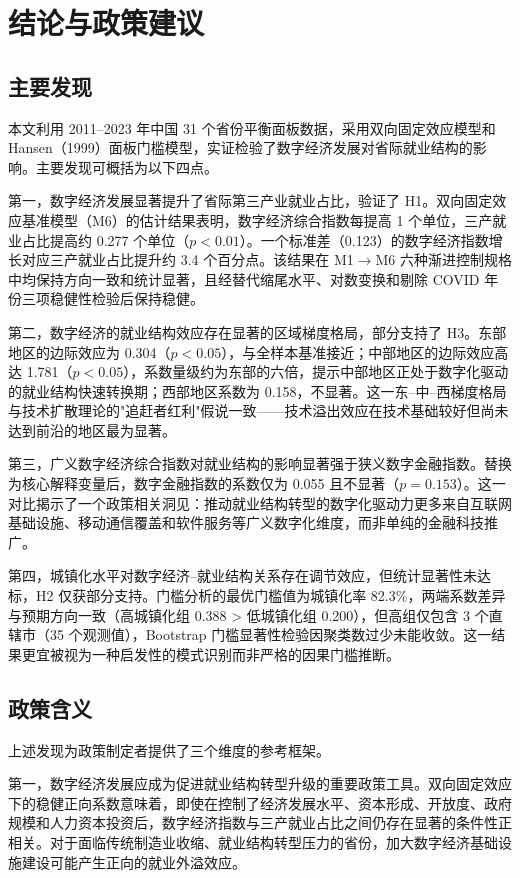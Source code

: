 \section{结论与政策建议}

\subsection{主要发现}

本文利用 2011--2023 年中国 31 个省份平衡面板数据，采用双向固定效应模型和 Hansen（1999）面板门槛模型，实证检验了数字经济发展对省际就业结构的影响。主要发现可概括为以下四点。

第一，数字经济发展显著提升了省际第三产业就业占比，验证了 H1。双向固定效应基准模型（M6）的估计结果表明，数字经济综合指数每提高 1 个单位，三产就业占比提高约 0.277 个单位（$p<0.01$）。一个标准差（0.123）的数字经济指数增长对应三产就业占比提升约 3.4 个百分点。该结果在 M1$\rightarrow$M6 六种渐进控制规格中均保持方向一致和统计显著，且经替代缩尾水平、对数变换和剔除 COVID 年份三项稳健性检验后保持稳健。

第二，数字经济的就业结构效应存在显著的区域梯度格局，部分支持了 H3。东部地区的边际效应为 0.304（$p<0.05$），与全样本基准接近；中部地区的边际效应高达 1.781（$p<0.05$），系数量级约为东部的六倍，提示中部地区正处于数字化驱动的就业结构快速转换期；西部地区系数为 0.158，不显著。这一东--中--西梯度格局与技术扩散理论的"追赶者红利"假说一致——技术溢出效应在技术基础较好但尚未达到前沿的地区最为显著。

第三，广义数字经济综合指数对就业结构的影响显著强于狭义数字金融指数。替换为核心解释变量后，数字金融指数的系数仅为 0.055 且不显著（$p=0.153$）。这一对比揭示了一个政策相关洞见：推动就业结构转型的数字化驱动力更多来自互联网基础设施、移动通信覆盖和软件服务等广义数字化维度，而非单纯的金融科技推广。

第四，城镇化水平对数字经济--就业结构关系存在调节效应，但统计显著性未达标，H2 仅获部分支持。门槛分析的最优门槛值为城镇化率 82.3\%，两端系数差异与预期方向一致（高城镇化组 0.388 > 低城镇化组 0.200），但高组仅包含 3 个直辖市（35 个观测值），Bootstrap 门槛显著性检验因聚类数过少未能收敛。这一结果更宜被视为一种启发性的模式识别而非严格的因果门槛推断。

\subsection{政策含义}

上述发现为政策制定者提供了三个维度的参考框架。

第一，数字经济发展应成为促进就业结构转型升级的重要政策工具。双向固定效应下的稳健正向系数意味着，即使在控制了经济发展水平、资本形成、开放度、政府规模和人力资本投资后，数字经济指数与三产就业占比之间仍存在显著的条件性正相关。对于面临传统制造业收缩、就业结构转型压力的省份，加大数字经济基础设施建设可能产生正向的就业外溢效应。

